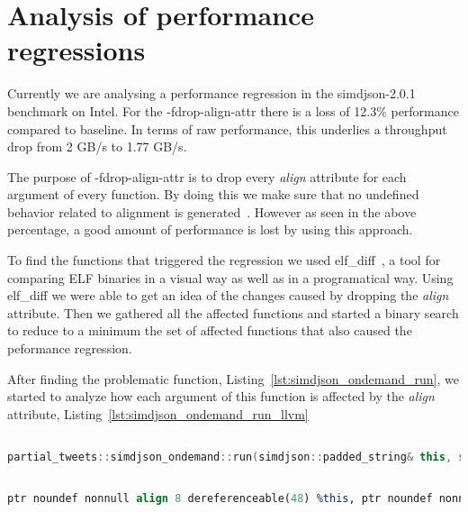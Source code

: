 \section{Analysis of performance regressions}

Currently we are analysing a performance regression in the
simdjson-2.0.1~\cite{simdjsonbenchmark} benchmark on Intel. For the
-fdrop-align-attr there is a loss of 12.3\% performance compared to baseline. In
terms of raw performance, this underlies a throughput drop from 2 GB/s to 1.77
GB/s. 

The purpose of -fdrop-align-attr is to drop every \textit{align} attribute for
each argument of every function. By doing this we make sure that no undefined
behavior related to alignment is generated~\cite{align-semantics}. However as
seen in the above percentage, a good amount of performance is lost by using this
approach.

To find the functions that triggered the regression we used
elf_diff~\cite{elfdiff}, a tool for comparing ELF binaries in a visual way as
well as in a programatical way. Using elf_diff we were able to get an idea of
the changes caused by dropping the \textit{align} attribute. Then we gathered
all the affected functions and started a binary search to reduce to a minimum
the set of affected functions that also caused the peformance regression.

After finding the problematic function, Listing~\ref{lst:simdjson_ondemand_run},
we started to analyze how each argument of this function is affected by the
\textit{align} attribute, Listing~\ref{lst:simdjson_ondemand_run_llvm}

\begin{lstlisting}[language=C++, style=Cstyle, caption={Function that caused
performance regressions}, label={lst:simdjson_ondemand_run}]

partial_tweets::simdjson_ondemand::run(simdjson::padded_string& this, std::vector<partial_tweets::tweet<std::basic_string_view<char, std::char_traits<char> > > json, std::allocator<partial_tweets::tweet<std::basic_string_view<char, std::char_traits<char> > > > >& result)

\end{lstlisting}


\begin{lstlisting}[language=llvm, style=Cstyle, caption={LLVM representation of
arguments of partial_tweets::simdjson_ondemand::run}, label={lst:simdjson_ondemand_run_llvm}]

ptr noundef nonnull align 8 dereferenceable(48) %this, ptr noundef nonnull align 8 dereferenceable(16) %json, ptr noundef nonnull align 8 dereferenceable(24) %result

\end{lstlisting}

